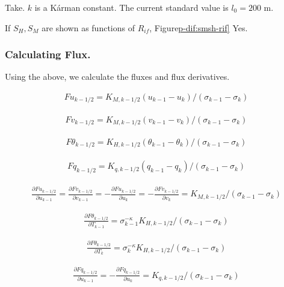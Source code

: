 Take. \(k\) is a Kárman constant. The current standard value is
\(l_0=200\) m.

If \(S_H, S_M\) are shown as functions of \(R_{if}\),
Figure\protect\hyperlink{p-dif:smsh-rif}{p-dif:smsh-rif{]}} Yes.

\hypertarget{calculating-flux.}{%
\subsubsection{Calculating Flux.}\label{calculating-flux.}}

Using the above, we calculate the fluxes and flux derivatives.

\begin{eqnarray}
  Fu_{k-1/2} = K_{M,k-1/2}(u_{k-1}-u_{k})/(\sigma_{k-1}-\sigma_{k})
\end{eqnarray}

\begin{eqnarray}
  Fv_{k-1/2} = K_{M,k-1/2}(v_{k-1}-v_{k})/(\sigma_{k-1}-\sigma_{k})
\end{eqnarray}

\begin{eqnarray}
  F\theta_{k-1/2} 
  = K_{H,k-1/2}(\theta_{k-1}-\theta_{k})/(\sigma_{k-1}-\sigma_{k})
\end{eqnarray}

\begin{eqnarray}
  Fq_{k-1/2} = K_{q,k-1/2}(q_{k-1}-q_{k})/(\sigma_{k-1}-\sigma_{k})
\end{eqnarray}

\begin{eqnarray}
     \frac{\partial Fu_{k-1/2}}{\partial u_{k-1}} =   \frac{\partial Fv_{k-1/2}}{\partial v_{k-1}} 
  = -\frac{\partial Fu_{k-1/2}}{\partial u_{k}} = - \frac{\partial Fv_{k-1/2}}{\partial v_{k}}  
  = K_{M,k-1/2}/(\sigma_{k-1}-\sigma_{k})
\end{eqnarray}

\begin{eqnarray}
  \frac{\partial F\theta_{k-1/2}}{\partial T_{k-1}}
  = \sigma_{k-1}^{-\kappa} K_{H,k-1/2}/(\sigma_{k-1}-\sigma_{k})
\end{eqnarray}

\begin{eqnarray}
  \frac{\partial F\theta_{k-1/2}}{\partial T_{k}}
 = \sigma_{k}^{-\kappa} K_{H,k-1/2}/(\sigma_{k-1}-\sigma_{k})
\end{eqnarray}

\begin{eqnarray}
  \frac{\partial Fq_{k-1/2}}{\partial u_{k-1}}
 = - \frac{\partial Fq_{k-1/2}}{\partial u_{k}}
 = K_{q,k-1/2}/(\sigma_{k-1}-\sigma_{k})
\end{eqnarray}

